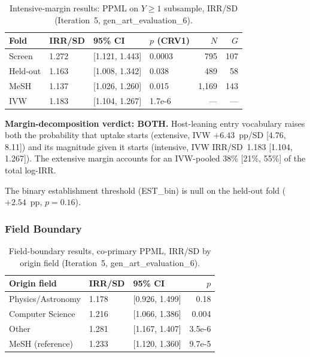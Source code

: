 \documentclass[11pt,letterpaper]{article}
\begin{document}
\begin{table}[!htbp]
\centering
\caption{Intensive-margin results: PPML on $Y \geq 1$ subsample, IRR/SD (Iteration~5, gen\_art\_evaluation\_6).}
\label{tab:intensive}
\begin{tabular}{lR{1.3cm}L{2.5cm}R{1.5cm}rr}
\toprule
Fold & IRR/SD & 95\% CI & $p$ (CRV1) & $N$ & $G$ \\
\midrule
Screen & 1.272 & [1.121, 1.443] & 0.0003 & 795 & 107 \\
Held-out & 1.163 & [1.008, 1.342] & 0.038 & 489 & 58 \\
MeSH & 1.137 & [1.026, 1.260] & 0.015 & 1,169 & 143 \\
IVW & 1.183 & [1.104, 1.267] & 1.7e-6 & --- & --- \\
\bottomrule
\end{tabular}
\end{table}

\textbf{Margin-decomposition verdict: BOTH.} Host-leaning entry vocabulary raises both the probability that uptake starts (extensive, IVW $+6.43$~pp/SD [4.76, 8.11]) and its magnitude given it starts (intensive, IVW IRR/SD~1.183 [1.104, 1.267]). The extensive margin accounts for an IVW-pooled 38\% [21\%, 55\%] of the total log-IRR.

The binary establishment threshold (EST\_bin) is null on the held-out fold ($+2.54$~pp, $p = 0.16$).

\subsubsection{Field Boundary}

\begin{table}[!htbp]
\centering
\caption{Field-boundary results, co-primary PPML, IRR/SD by origin field (Iteration~5, gen\_art\_evaluation\_6).}
\label{tab:field_boundary}
\begin{tabular}{lR{1.3cm}L{2.5cm}r}
\toprule
Origin field & IRR/SD & 95\% CI & $p$ \\
\midrule
Physics/Astronomy & 1.178 & [0.926, 1.499] & 0.18 \\
Computer Science & 1.216 & [1.066, 1.386] & 0.004 \\
Other & 1.281 & [1.167, 1.407] & 3.5e-6 \\
MeSH (reference) & 1.233 & [1.120, 1.360] & 9.7e-5 \\
\bottomrule
\end{tabular}
\end{table}
\end{document}
